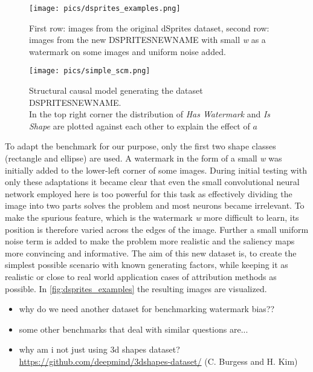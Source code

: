 \begin{figure}[H]
    \centering
    \texttt{[image: pics/dsprites\_examples.png]}
    \caption{First row: images from the original dSprites dataset, second row: images from the new DSPRITESNEWNAME with small \textit{w} as a watermark on some images and uniform noise added.}
    \label{fig:dsprites_examples}
\end{figure}

\begin{figure}[H]
    \centering
    \texttt{[image: pics/simple\_scm.png]}
    \caption{Structural causal model generating the dataset DSPRITESNEWNAME.\\
    In the top right corner the distribution of \textit{Has Watermark} and \textit{Is Shape} are plotted against each other to explain the effect of $a$}
    \label{fig:simple_scm}
\end{figure}

To adapt the benchmark for our purpose, only the first two shape classes (rectangle and ellipse) are used. A watermark in the form of a small \textit{w} was initially added to the lower-left corner of some images. During initial testing with only these adaptations it became clear that even the small convolutional neural network employed here is too powerful for this task as effectively dividing the image into two parts solves the problem and most neurons became irrelevant.
To make the spurious feature, which is the watermark \textit{w} more difficult to learn, its position is therefore varied across the edges of the image. Further a small uniform noise term is added to make the problem more realistic and the saliency maps more convincing and informative.
The aim of this new dataset is, to create the simplest possible scenario with known generating factors, while keeping it as realistic or close to real world application cases of attribution methods as possible. In \autoref{fig:dsprites_examples} the resulting images are visualized.

\begin{itemize}
    \item why do we need another dataset for benchmarking watermark bias??
    \item some other benchmarks that deal with similar questions are...
    \item why am i not just using 3d shapes dataset? \url{https://github.com/deepmind/3dshapes-dataset/} (C. Burgess and H. Kim)
\end{itemize}

